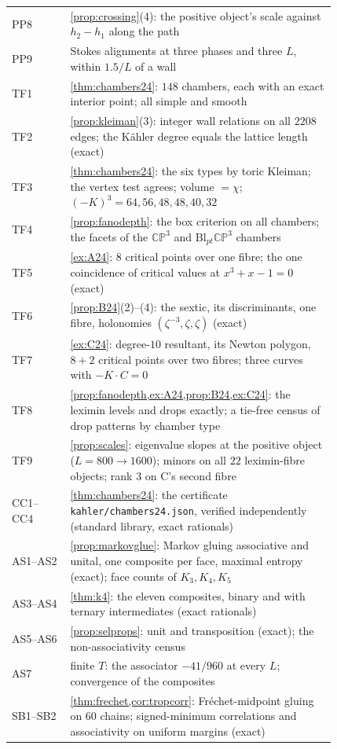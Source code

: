 \documentclass[11pt]{article}
\theoremstyle{definition}\newtheorem{definition}[theorem]{Definition}\newtheorem{remark}[theorem]{Remark}\newtheorem{example}[theorem]{Example}\newtheorem{problem}[theorem]{Open problem}\crefname{problem}{Problem}{Problems}
\begin{document}
{\begin{longtable}{lp{0.82\linewidth}}
PP8 & \cref{prop:crossing}(4): the positive object's scale against $h_2-h_1$ along the path\\
PP9 & Stokes alignments at three phases and three $L$, within $1.5/L$ of a wall\\
TF1 & \cref{thm:chambers24}: $148$ chambers, each with an exact interior point; all simple and smooth\\
TF2 & \cref{prop:kleiman}(3): integer wall relations on all $2208$ edges; the K\"ahler degree equals the lattice length (exact)\\
TF3 & \cref{thm:chambers24}: the six types by toric Kleiman; the vertex test agrees; volume $=\chi$; $(-K)^3=64,56,48,48,40,32$\\
TF4 & \cref{prop:fanodepth}: the box criterion on all chambers; the facets of the $\mathbb{CP}^3$ and $\mathrm{Bl}_{pt}\mathbb{CP}^3$ chambers\\
TF5 & \cref{ex:A24}: $8$ critical points over one fibre; the one coincidence of critical values at $x^3+x-1=0$ (exact)\\
TF6 & \cref{prop:B24}(2)--(4): the sextic, its discriminants, one fibre, holonomies $(\zeta^{-3},\zeta,\zeta)$ (exact)\\
TF7 & \cref{ex:C24}: degree-$10$ resultant, its Newton polygon, $8+2$ critical points over two fibres; three curves with $-K\cdot C=0$\\
TF8 & \cref{prop:fanodepth,ex:A24,prop:B24,ex:C24}: the leximin levels and drops exactly; a tie-free census of drop patterns by chamber type\\
TF9 & \cref{prop:scales}: eigenvalue slopes at the positive object ($L=800\to1600$); minors on all $22$ leximin-fibre objects; rank $3$ on C's second fibre\\
CC1--CC4 & \cref{thm:chambers24}: the certificate \texttt{kahler/chambers24.json}, verified independently (standard library, exact rationals)\\
AS1--AS2 & \cref{prop:markovglue}: Markov gluing associative and unital, one composite per face, maximal entropy (exact); face counts of $K_3,K_4,K_5$\\
AS3--AS4 & \cref{thm:k4}: the eleven composites, binary and with ternary intermediates (exact rationals)\\
AS5--AS6 & \cref{prop:selprops}: unit and transposition (exact); the non-associativity census\\
AS7 & finite $T$: the associator $-41/960$ at every $L$; convergence of the composites\\
SB1--SB2 & \cref{thm:frechet,cor:tropcorr}: Fr\'echet-midpoint gluing on $60$ chains; signed-minimum correlations and associativity on uniform margins (exact)\\

\end{longtable}}
\end{document}
